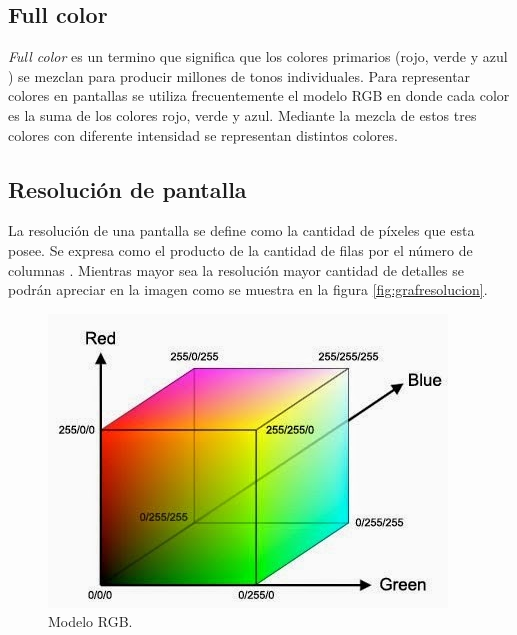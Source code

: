 \subsection{Full color}
\textit{Full color} es un termino que significa que los colores primarios (rojo, verde y azul ) se mezclan para producir millones de tonos individuales. Para representar colores en pantallas se utiliza frecuentemente el modelo RGB en donde cada color es la suma de los colores rojo, verde y azul. Mediante la mezcla de estos tres colores con diferente intensidad se representan distintos colores.



\subsection{Resolución de pantalla}
La resolución de una pantalla se define como la cantidad de píxeles que esta posee. Se expresa como el producto de la cantidad de filas por el número de columnas \citep{WIKIRESOL}. Mientras mayor sea la resolución mayor cantidad de detalles se podrán apreciar en la imagen como se muestra en la figura \ref{fig:grafresolucion}.

\begin{figure}[htpb]
	\centering
	\includegraphics[scale=0.6]{Figures/modelorgb.jpg} 
	\caption{Modelo RGB\protect\footnotemark.}
	\label{fig:grafrgb}
\end{figure}

